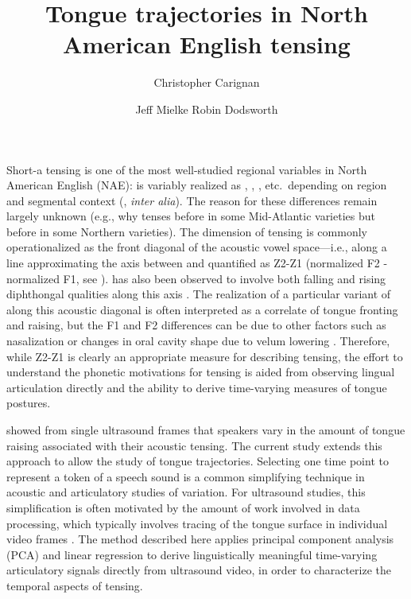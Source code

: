 \documentclass[output=paper]{LSP/langsci}
\author{Christopher Carignan\affiliation{North Carolina State University} \and Jeff Mielke\affiliation{North Carolina State University} \lastand Robin Dodsworth\affiliation{North Carolina State University}}
\title{Tongue trajectories in {N}orth {A}merican {E}nglish \ips{æ} tensing}
\begin{document}
 



Short-a tensing is one of the most well-studied regional variables in North American English (NAE): \ips{\ae} is variably realized as \ip{\ae}, , , etc.~depending on region and segmental context 
(\citealp{ash_distribution_2002,becker_short-system_2009,boberg_regional_2008,boberg_short-cincinnati:_2000,labov_atlas_2006-1,plichta_interdisciplinary_2005}, \textit{inter alia}). The reason for these differences remain largely unknown (e.g., why \ips{\ae} tenses before  in some Mid-Atlantic varieties but before  in some Northern varieties). The dimension of \ips{\ae} tensing is commonly operationalized as the front diagonal of the acoustic vowel space---i.e., along a line approximating the axis between  and  quantified as Z2-Z1 (normalized F2 - normalized F1, see \citealp{labov_one_2013}). \ips{\ae} has also been observed to involve both falling and rising diphthongal qualities along this axis \citep{assmann_time-varying_2000,fox_cross-dialectal_2009,labov_atlas_2006-1}.  The realization of a particular variant of \ips{\ae} along this acoustic diagonal is often interpreted as a correlate of tongue fronting and raising, but the F1 and F2 differences can be due to other factors such as nasalization \citep{decker_are_2012} or changes in oral cavity shape due to velum lowering \citep{baker_more_2008}.  Therefore, while Z2-Z1 is clearly an appropriate measure for describing \ips{\ae} tensing, the effort to understand the phonetic motivations for \ips{\ae} tensing is aided from observing lingual articulation directly and the ability to derive time-varying measures of tongue postures. 

\citet{decker_are_2012} showed from single ultrasound frames that speakers vary in the amount of tongue raising associated with their acoustic tensing.  The current study extends this approach to allow the study of tongue trajectories. Selecting one time point to represent a token of a speech sound is a common simplifying technique in acoustic and articulatory studies of variation.  For ultrasound studies, this simplification is often motivated by the amount of work involved in data processing, which typically involves tracing of the tongue surface in individual video frames \citep{li_automatic_2005}.
The method described here applies principal component analysis (PCA) and linear regression to derive linguistically meaningful time-varying articulatory signals directly from ultrasound video, in order to characterize the temporal aspects of \ips{\ae} tensing.
\end{document}
